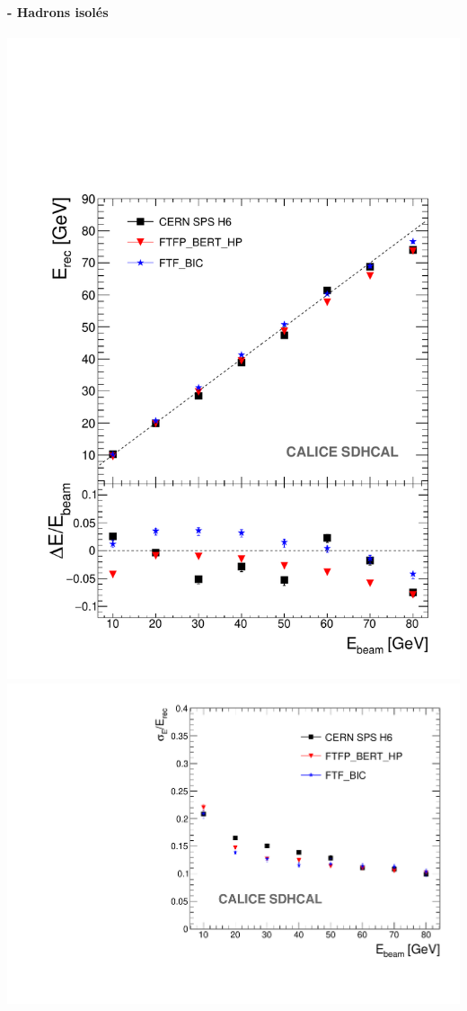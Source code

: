 \documentclass[8pt]{beamer}
\begin{document}
  \begin{frame}
  \frametitle{\secname}
  \framesubtitle{\subsecname - Hadrons isolés}
    \begin{center}
      \includegraphics[width=0.48\linewidth]{Single_MC_DATA_COMP_ERec.pdf}
      \includegraphics[width=0.48\linewidth]{Single_MC_DATA_COMP_EResol.pdf}
    \end{center}
  \end{frame}
\end{document}
